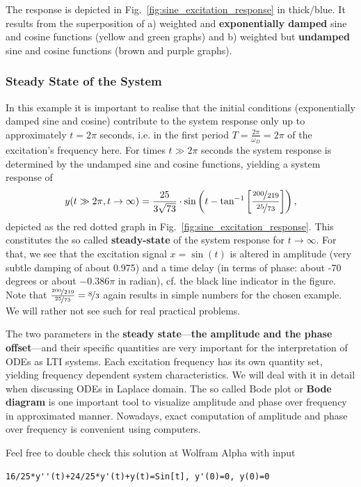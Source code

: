 The response is depicted in Fig.~\ref{fig:sine_excitation_response} in
thick/blue.
It results from the superposition of a) weighted and \textbf{exponentially damped}
sine and cosine functions (yellow and green graphs) and b) weighted but \textbf{undamped}
sine and cosine functions (brown and purple graphs).

\subsubsection{Steady State of the System}
%
In this example it is important to realise that the initial conditions
(exponentially damped sine and cosine) contribute
to the system response only up to approximately $t=2\pi$
seconds, i.e. in the first period $T=\frac{2\pi}{\omega_D}=2\pi$ of the
excitation's frequency here.
%
For times $t\gg2\pi$ seconds the system response is determined by the
undamped sine and cosine functions, yielding a system response of
\begin{align}
\label{eq:steadystate_timedomain}
y(t\gg 2\pi, t\to\infty) = \frac{25}{3 \sqrt{73}}\cdot
\sin\left(t-\tan^{-1}
\left[\frac{\nicefrac{200}{219}}{\nicefrac{25}{73}}\right]\right),
\end{align}
depicted as the red dotted graph in Fig.~\ref{fig:sine_excitation_response}.
This constitutes the so called \textbf{steady-state} of the system response
for $t\to\infty$.
For that, we see that the excitation signal $x=\sin(t)$ is altered in amplitude
(very subtle damping of about 0.975) and
a time delay (in terms of phase: about -70 degrees or about $-0.386 \pi$ in
radian), cf. the black line indicator in the figure.
Note that $\frac{\nicefrac{200}{219}}{\nicefrac{25}{73}} = \nicefrac{8}{3}$ again
results in simple numbers for the chosen example. We will rather not see such
for real practical problems.

The two parameters in the
\textbf{steady state}---\textbf{the amplitude and the phase offset}---and
their specific quantities are very important for the
interpretation of ODEs as LTI systems. Each excitation frequency has its own
quantity set, yielding frequency dependent system characteristics.
We will deal with it in detail when discussing ODEs in Laplace domain.
%
The so called Bode plot or \textbf{Bode diagram} is one important tool
to visualize amplitude and phase over frequency in approximated manner.
%
Nowadays, exact computation of amplitude and phase over frequency is convenient
using computers.

Feel free to double check this solution at Wolfram Alpha with input
\begin{verbatim}
16/25*y''(t)+24/25*y'(t)+y(t)=Sin[t], y'(0)=0, y(0)=0
\end{verbatim}





